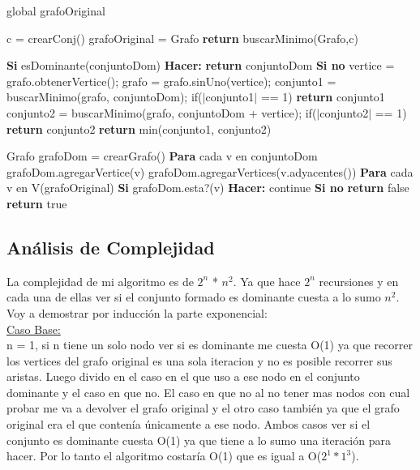 global grafoOriginal

\begin{codebox}
\li	c = crearConj()
\li	grafoOriginal = Grafo
\li	\textbf{return} buscarMinimo(Grafo,c)
\end{codebox}

\begin{codebox}
\li\textbf{Si} esDominante(conjuntoDom) \textbf{Hacer:} \Do
\li		\textbf{return} conjuntoDom 
\End
\li	\textbf{Si no}  \Do
\li		vertice = grafo.obtenerVertice(); 
\li		grafo = grafo.sinUno(vertice);
\li		conjunto1 = buscarMinimo(grafo, conjuntoDom);
\li		if($|$conjunto1$|$ == 1) \textbf{return} conjunto1
\li		conjunto2 = buscarMinimo(grafo, conjuntoDom + vertice);
\li		if($|$conjunto2$|$ == 1) \textbf{return} conjunto2
\li		\textbf{return} min(conjunto1, conjunto2)	
\End

\end{codebox}

\begin{codebox}
\li Grafo grafoDom = crearGrafo()
\li \textbf{Para} cada v en conjuntoDom \Do
\li	grafoDom.agregarVertice(v)
\li     grafoDom.agregarVertices(v.adyacentes())
\End
\li \textbf{Para} cada v en V(grafoOriginal) \Do
\li \textbf{Si} grafoDom.esta?(v) \textbf{Hacer:} \Do
\li			continue 
\End		
\li \textbf{Si no}  \Do						
\li		\textbf{return} false
    \End		
	\End
\li	\textbf{return} true

\end{codebox}

\subsection{Análisis de Complejidad}

La complejidad de mi algoritmo es de $2^n$ * $n^2$. Ya que hace $2^n$ recursiones y en cada una de ellas ver si el conjunto formado es dominante cuesta a lo sumo $n^2$. Voy a demostrar por inducción la parte exponencial:\\

\underline{Caso Base:}\\

n = 1, si n tiene un solo nodo ver si es dominante me cuesta O(1) ya que recorrer los vertices del grafo original es una sola iteracion y no es posible recorrer sus aristas. Luego divido en el caso en el que uso a ese nodo en el conjunto dominante y el caso en que no. El caso en que no al no tener mas nodos con cual probar me va a devolver el grafo original y el otro caso también ya que el grafo original era el que contenía únicamente a ese nodo. Ambos casos ver si el conjunto es dominante cuesta O(1) ya que tiene a lo sumo una iteración para hacer. Por lo tanto el algoritmo costaría O(1) que es igual a O($2^1*1^3$).\\

